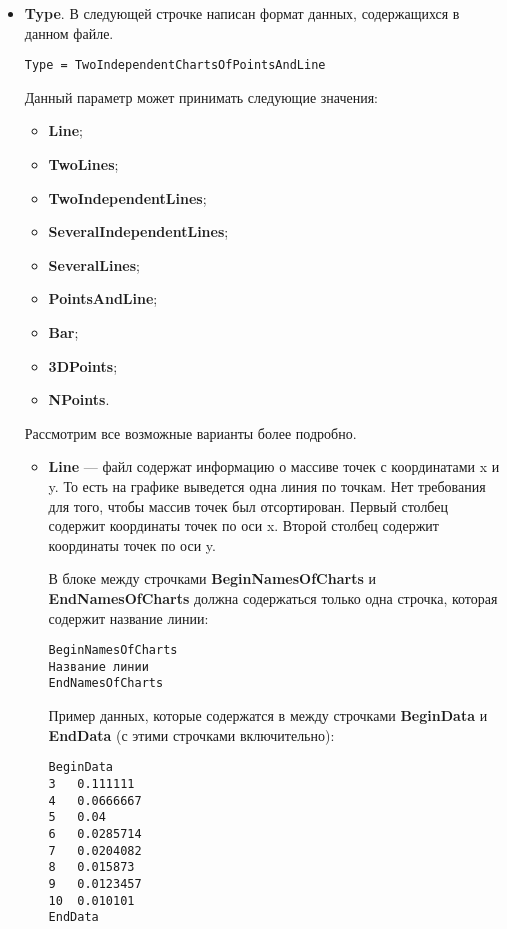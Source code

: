 \documentclass[a4paper,12pt]{article}
\begin{document}
\begin{itemize}
\item \textbf{Type}.
В следующей строчке написан формат данных, содержащихся в данном файле.
\begin{lstlisting}[label=Line03,caption=Строчка с описанием типа данных в файле]
Type = TwoIndependentChartsOfPointsAndLine
\end{lstlisting}
Данный параметр может принимать следующие значения:

\begin{itemize}
\item \textbf{Line};
\item \textbf{TwoLines};
\item \textbf{TwoIndependentLines};
\item \textbf{SeveralIndependentLines};
\item \textbf{SeveralLines};
\item \textbf{PointsAndLine};
\item \textbf{Bar};
\item \textbf{3DPoints};
\item \textbf{NPoints}.
\end{itemize}

Рассмотрим все возможные варианты более подробно.

\begin{itemize}
\item \textbf{Line} --- файл содержат информацию о массиве точек с координатами x и y. То есть на графике выведется одна линия по точкам. Нет требования для того, чтобы массив точек был отсортирован.  Первый столбец содержит координаты точек по оси x. Второй столбец содержит координаты точек по оси y.

В блоке между строчками \textbf{BeginNamesOfCharts} и \textbf{EndNamesOfCharts} должна содержаться только одна строчка, которая содержит название линии:
\begin{lstlisting}[label=Line03_2,caption=Для Line ]
BeginNamesOfCharts
Название линии
EndNamesOfCharts
\end{lstlisting}

Пример данных, которые содержатся в между строчками \textbf{BeginData} и \textbf{EndData} (с этими строчками включительно):
\begin{lstlisting}[label=Line03_3,caption=Для Line ]
BeginData
3	0.111111
4	0.0666667
5	0.04
6	0.0285714
7	0.0204082
8	0.015873
9	0.0123457
10	0.010101
EndData
\end{lstlisting}


\end{itemize}
\end{itemize}
\end{document}
